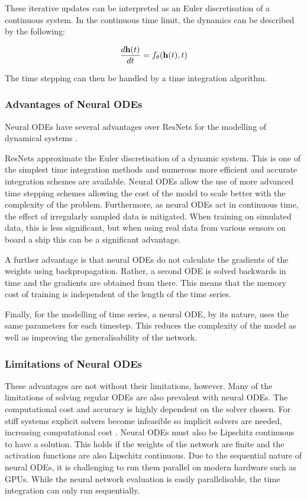These iterative updates can be interpreted as an Euler discretisation of a continuous system. In the continuous time limit, the dynamics can be described by the following:

\begin{equation}
    \frac{d \mathbf{h}(t)}{d t} = f_\theta(\mathbf{h}(t), t)
    \label{eq:neural_ode}
\end{equation}

The time stepping can then be handled by a time integration algorithm. 

\subsubsection{Advantages of Neural ODEs}
\label{subsubsec:neural_ode_advantages}
Neural ODEs have several advantages over ResNets
for the modelling of dynamical systems \parencite{chenNeuralOrdinaryDifferential2018}. 

ResNets approximate the Euler discretisation of a dynamic system. This is one of the simplest time integration methods
and numerous more efficient and accurate integration schemes are available. Neural ODEs allow the use of more advanced time stepping schemes
allowing the cost of the model to scale better with the complexity of the problem. Furthermore, as neural ODEs act in
continuous time, the effect of irregularly sampled data is mitigated. When training on simulated data, this is less
significant, but when using real data from various sensors on board a ship this can be a significant advantage. 

A further advantage is that neural ODEs do not calculate the gradients of the weights using backpropagation. Rather, a second ODE
is solved backwards in time and the gradients are obtained from there. This means that the memory cost of training is
independent of the length of the time series. 

Finally, for the modelling of time series, a neural ODE, by its nature, uses the same parameters for each timestep. This
reduces the complexity of the model as well as improving the generalisability of the network.

\subsubsection{Limitations of Neural ODEs}
\label{subsubsec:neural_ode_limitations}
These advantages are not without their limitations, however. Many of the limitations of solving regular ODEs are also
prevalent with neural ODEs. The computational cost and accuracy is highly dependent on the solver chosen. For stiff
systems explicit solvers become infeasible so implicit solvers are needed, increasing computational cost
\parencite{anantharamanStablyAcceleratingStiff2022}. Neural
ODEs must also be Lipschitz continuous to have a solution. This holds if the weights of the network are finite and the
activation functions are also Lipschitz continuous. Due to the sequential nature of neural ODEs, it is challenging to
run them parallel on modern hardware such as GPUs. While the neural network evaluation is easily parallelisable, the time
integration can only run sequentially.

